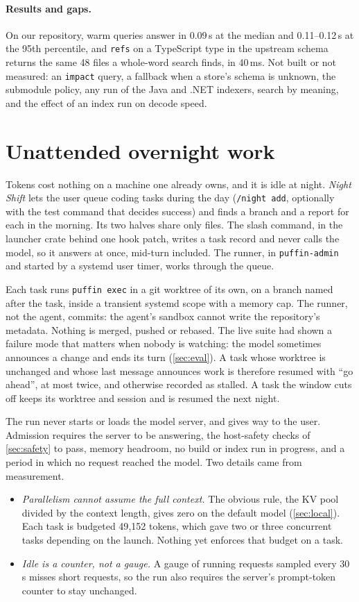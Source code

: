 \documentclass[11pt]{article}
\newcommand{\code}[1]{\texttt{#1}}
\begin{document}
\paragraph{Results and gaps.} On our repository, warm queries answer in 0.09\,s at the median and
0.11--0.12\,s at the 95th percentile, and \code{refs} on a TypeScript type in the upstream schema
returns the same 48 files a whole-word search finds, in 40\,ms. Not built or not measured: an
\code{impact} query, a fallback when a store's schema is unknown, the submodule policy, any run of
the Java and .NET indexers, search by meaning, and the effect of an index run on decode speed.

\section{Unattended overnight work}
\label{sec:night}

Tokens cost nothing on a machine one already owns, and it is idle at night. \emph{Night Shift}
lets the user queue coding tasks during the day (\code{/night add}, optionally with the test
command that decides success) and finds a branch and a report for each in the morning. Its two
halves share only files. The slash command, in the launcher crate behind one hook patch, writes a
task record and never calls the model, so it answers at once, mid-turn included. The runner, in
\code{puffin-admin} and started by a systemd user timer, works through the queue.

Each task runs \code{puffin exec} in a git worktree of its own, on a branch named after the task,
inside a transient systemd scope with a memory cap. The runner, not the agent, commits: the
agent's sandbox cannot write the repository's metadata. Nothing is merged, pushed or rebased. The
live suite had shown a failure mode that matters when nobody is watching: the model sometimes
announces a change and ends its turn (\cref{sec:eval}). A task whose worktree is unchanged and
whose last message announces work is therefore resumed with ``go ahead'', at most twice, and
otherwise recorded as stalled. A task the window cuts off keeps its worktree and session and is
resumed the next night.

The run never starts or loads the model server, and gives way to the user. Admission requires the
server to be answering, the host-safety checks of \cref{sec:safety} to pass, memory headroom, no
build or index run in progress, and a period in which no request reached the model. Two details
came from measurement.
\begin{itemize}
  \item \emph{Parallelism cannot assume the full context.} The obvious rule, the KV pool divided
    by the context length, gives zero on the default model (\cref{sec:local}). Each task is
    budgeted 49{,}152 tokens, which gave two or three concurrent tasks depending on the launch.
    Nothing yet enforces that budget on a task.
  \item \emph{Idle is a counter, not a gauge.} A gauge of running requests sampled every 30\,s
    misses short requests, so the run also requires the server's prompt-token counter to stay
    unchanged.
\end{itemize}
\end{document}
